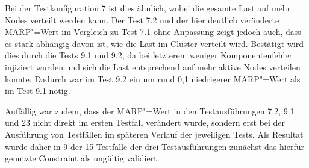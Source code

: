 Bei der Testkonfiguration 7 ist dies ähnlich, wobei die gesamte Last auf mehr Nodes verteilt werden kann.
Der Test 7.2 und der hier deutlich veränderte \ac{MARP}"=Wert im Vergleich zu Test 7.1 ohne Anpassung zeigt jedoch auch, dass es stark abhängig davon ist, wie die Last im Cluster verteilt wird.
Bestätigt wird dies durch die Tests 9.1 und 9.2, da bei letzterem weniger Komponentenfehler injiziert wurden und sich die Last entsprechend auf mehr aktive Nodes verteilen konnte.
Dadurch war im Test 9.2 ein um rund 0,1 niedrigerer \ac{MARP}"=Wert als im Test 9.1 nötig.

Auffällig war zudem, dass der \ac{MARP}"=Wert in den Testausführungen 7.2, 9.1 und 23 nicht direkt im ersten Testfall verändert wurde, sondern erst bei der Ausführung von Testfällen im späteren Verlauf der jeweiligen Tests.
Als Resultat wurde daher in 9 der 15 Testfälle der drei Testausführungen zunächst das hierfür genutzte Constraint als ungültig validiert.
